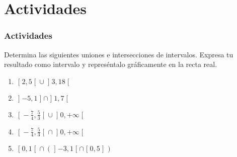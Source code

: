 \documentclass[12pt,spanish,x11names]{beamer}
\begin{document}
\section{Actividades}
\begin{frame}
  \frametitle{Actividades}
  \begin{exampleblock}{Determina las siguientes uniones e intersecciones de intervalos. Expresa tu
resultado como intervalo y represéntalo gráficamente en la recta real.}
\begin{enumerate}
\item $\mathclose[ 2,5 \mathclose[\cup \mathopen]3,18\mathclose[$ 
\item $\mathopen] -5,1 \mathopen]\cap \mathopen]1,7\mathclose[$ 
\item $\mathclose[ -\frac{7}{4},\frac{5}{3} \mathclose[\cup \mathopen] 0,+\infty\mathclose[$ 
\item $\mathclose[ -\frac{7}{4},\frac{5}{3} \mathclose[\cap \mathopen]
  0,+\infty\mathclose[$
  \item $\mathclose[ 0,1 \mathclose[\cap \left(\mathopen] -3,1 \mathclose[ \cap
      \mathclose[0,5 \mathopen] \right)$
\end{enumerate}
  \end{exampleblock}
\end{frame}
\end{document}
